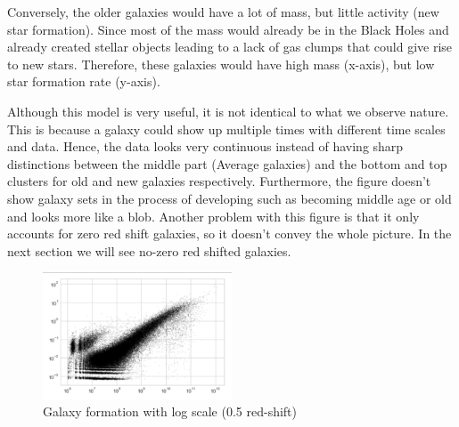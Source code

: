 \documentclass[12pt]{article}
\begin{document}
Conversely, the older galaxies would have a lot of mass, but little activity (new star formation). Since most of the mass would already be in the Black Holes and already created stellar objects leading to a lack of gas clumps that could give rise to new stars. Therefore, these galaxies would have high mass (x-axis), but low star formation rate (y-axis). 

Although this model is very useful, it is not identical to what we observe nature. This is because a galaxy could show up multiple times with different time scales and data. Hence, the data looks very continuous instead of having sharp distinctions between the middle part (Average galaxies) and the bottom and top clusters for old and new galaxies respectively. Furthermore, the figure doesn't show galaxy sets in the process of developing such as becoming middle age or old and looks more like a blob. Another problem with this figure is that it only accounts for zero red shift galaxies, so it doesn't convey the whole picture. In the next section we will see no-zero red shifted galaxies.
\begin{figure}[h]
  \caption{Galaxy formation with log scale (0.5 red-shift)}
  \centering
  \includegraphics[width=0.5\textwidth]{g.png}
\end{figure}
\end{document}
